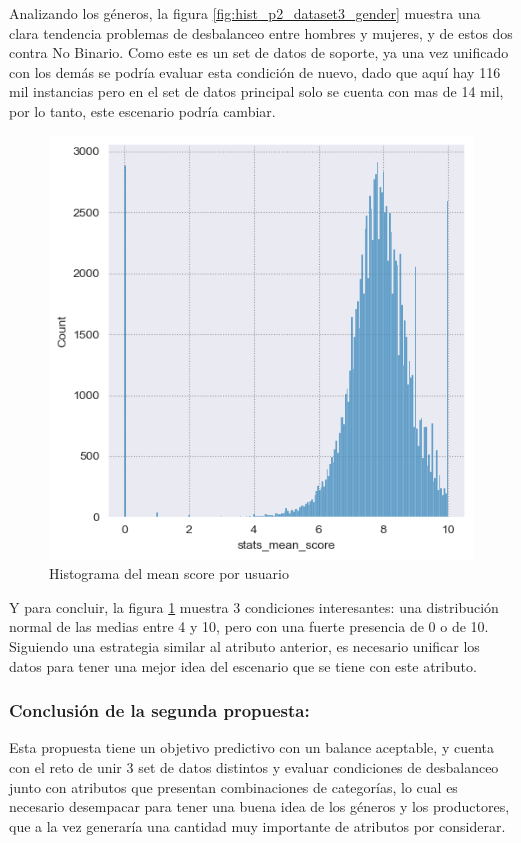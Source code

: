 \documentclass[a4paper]{article}
\begin{document}
Analizando los géneros, la figura \ref{fig:hist_p2_dataset3_gender} muestra una clara tendencia problemas de desbalanceo entre hombres y mujeres, y de estos dos contra No Binario. Como este es un set de datos de soporte, ya una vez unificado con los demás se podría evaluar esta condición de nuevo, dado que aquí hay 116 mil instancias pero en el set de datos principal solo se cuenta con mas de 14 mil, por lo tanto, este escenario podría cambiar.

\begin{figure}[hbtp!]
    \centering
    \includegraphics[width=0.5\linewidth]{Module_4_BigData//Proyecto//Propuestas//Imagenes/p2_dataset3_user_mean_score_histogram.png}
    \caption{Histograma del mean score por usuario}
    \label{fig:hist_p2_dataset3_mean_score}
\end{figure}

Y para concluir, la figura \ref{fig:hist_p2_dataset3_mean_score} muestra 3 condiciones interesantes: una distribución normal de las medias entre 4 y 10, pero con una fuerte presencia de 0 o de 10. Siguiendo una estrategia similar al atributo anterior, es necesario unificar los datos para tener una mejor idea del escenario que se tiene con este atributo.

\subsubsection{Conclusión de la segunda propuesta:}
Esta propuesta tiene un objetivo predictivo con un balance aceptable, y cuenta con el reto de unir 3 set de datos distintos y evaluar condiciones de desbalanceo junto con atributos que presentan combinaciones de categorías, lo cual es necesario desempacar para tener una buena idea de los géneros y los productores, que a la vez generaría una cantidad muy importante de atributos por considerar.
\end{document}
